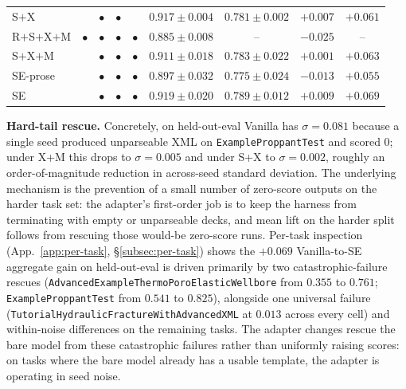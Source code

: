 \documentclass{article}
\begin{document}
\begin{table}[t]
{\begin{tabular}{l|cccc|cccc}
    S$+$X          &         & $\bullet$ & $\bullet$ &         & $0.917 \pm 0.004$           & $0.781 \pm \mathbf{0.002}$   & $+0.007$          & $+0.061$          \\
    R$+$S$+$X$+$M  & $\bullet$ & $\bullet$ & $\bullet$ & $\bullet$ & $0.885 \pm 0.008$           & --                           & $-0.025$          & --                \\
    \midrule
    S$+$X$+$M      &         & $\bullet$ & $\bullet$ & $\bullet$ & $0.911 \pm 0.018$           & $0.783 \pm 0.022$            & $+0.001$          & $+0.063$          \\
    SE-prose       &         & $\bullet$ & $\bullet$ & $\bullet$ & $0.897 \pm 0.032$           & $0.775 \pm 0.024$            & $-0.013$          & $+0.055$          \\
    SE             &         & $\bullet$ & $\bullet$ & $\bullet$ & $0.919 \pm 0.020$           & $\mathbf{0.789 \pm 0.012}$   & $+0.009$          & $\mathbf{+0.069}$ \\
    \bottomrule
  \end{tabular}}
\end{table}

\textbf{Hard-tail rescue.} Concretely, on held-out-eval Vanilla has $\sigma = 0.081$ because a single seed produced unparseable XML on \texttt{ExampleProppantTest} and scored 0; under X+M this drops to $\sigma = 0.005$ and under S+X to $\sigma = 0.002$, roughly an order-of-magnitude reduction in across-seed standard deviation. The underlying mechanism is the prevention of a small number of zero-score outputs on the harder task set: the adapter's first-order job is to keep the harness from terminating with empty or unparseable decks, and mean lift on the harder split follows from rescuing those would-be zero-score runs. Per-task inspection (App.~\ref{app:per-task}, \S\ref{subsec:per-task}) shows the $+0.069$ Vanilla-to-SE aggregate gain on held-out-eval is driven primarily by two catastrophic-failure rescues (\texttt{AdvancedExampleThermoPoroElasticWellbore} from $0.355$ to $0.761$; \texttt{ExampleProppantTest} from $0.541$ to $0.825$), alongside one universal failure (\texttt{TutorialHydraulicFractureWithAdvancedXML} at $0.013$ across every cell) and within-noise differences on the remaining tasks. The adapter changes rescue the bare model from these catastrophic failures rather than uniformly raising scores: on tasks where the bare model already has a usable template, the adapter is operating in seed noise.
\end{document}
